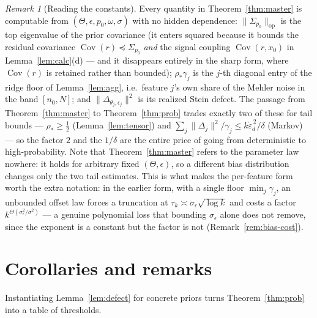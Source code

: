 \documentclass[11pt]{article}
\theoremstyle{remark}
\newtheorem{remark}{Remark}
\newcommand{\Cov}{\operatorname{Cov}}
\newcommand{\Sig}{\Sigma_{p_0}}
\newcommand{\op}[1]{\lVert #1 \rVert_{\mathrm{op}}}
\begin{document}
\begin{remark}[Reading the constants]\label{rem:constants}
Every quantity in Theorem~\ref{thm:master} is computable from $(\Theta, \epsilon, p_0, \omega, \sigma)$ with no hidden dependence: $\op{\Sig}$ is the top eigenvalue of the prior covariance (it enters squared because it bounds the residual covariance $\Cov(r) \preceq \Sig$ \emph{and} the signal coupling $\Cov(r,x_0)$ in Lemma~\ref{lem:calc}(d) --- and it disappears entirely in the sharp form, where $\Cov(r)$ is retained rather than bounded); $\rho_*\gamma_j$ is the $j$-th diagonal entry of the ridge floor of Lemma~\ref{lem:agg}, i.e.\ feature $j$'s own share of the Mehler noise in the band $[n_0,N]$; and $\lVert\Delta_{\theta_j,\epsilon_j}\rVert^2$ is its realized Stein defect. The passage from Theorem~\ref{thm:master} to Theorem~\ref{thm:prob} trades exactly two of these for tail bounds --- $\rho_* \ge \tfrac12$ (Lemma~\ref{lem:tensor}) and $\sum_j \lVert\Delta_j\rVert^2/\gamma_j \le k\check\varepsilon_d^{\,2}/\delta$ (Markov) --- so the factor $2$ and the $1/\delta$ are the entire price of going from deterministic to high-probability. Note that Theorem~\ref{thm:master} refers to the parameter law nowhere: it holds for arbitrary fixed $(\Theta,\epsilon)$, so a different bias distribution changes only the two tail estimates. This is what makes the per-feature form worth the extra notation: in the earlier form, with a single floor $\min_j\gamma_j$, an unbounded offset law forces a truncation at $\tau_k \asymp \sigma_\epsilon\sqrt{\log k}$ and costs a factor $k^{\Theta(\sigma_\epsilon^2/\sigma^2)}$ --- a genuine polynomial loss that bounding $\sigma_\epsilon$ alone does not remove, since the exponent is a constant but the factor is not (Remark~\ref{rem:bias-cost}).
\end{remark}

\section{Corollaries and remarks}\label{sec:corollaries}

Instantiating Lemma~\ref{lem:defect} for concrete priors turns Theorem~\ref{thm:prob} into a table of thresholds.
\end{document}
